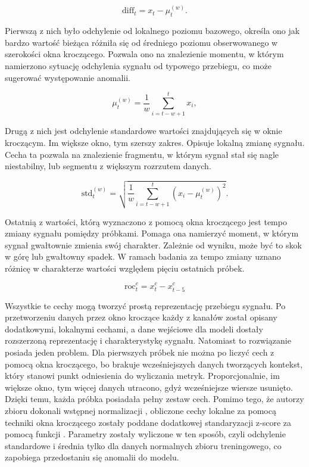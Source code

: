 \documentclass[a4paper,twoside,12pt]{book}
\begin{document}
	\begin{equation}
		\text{diff}_t = x_t - \mu_t^{(w)}.
	\end{equation}
	
	Pierwszą z nich było odchylenie od lokalnego poziomu bazowego, określa ono jak bardzo wartość bieżąca różniła się od średniego poziomu obserwowanego w szerokości okna kroczącego. Pozwala ono na znalezienie momentu, w którym namierzono sytuację odchylenia sygnału od typowego przebiegu, co może sugerować występowanie anomalii. 
	
	\begin{equation}
		\mu_t^{(w)} = \frac{1}{w} \sum_{i=t-w+1}^{t} x_i,
	\end{equation}
	
	Drugą z nich jest odchylenie standardowe wartości znajdujących się w oknie kroczącym. Im większe okno, tym szerszy zakres. Opisuje lokalną zmianę sygnału. Cecha ta pozwala na znalezienie fragmentu, w którym sygnał stał się nagle niestabilny, lub segmentu z większym rozrzutem danych.
	
	\begin{equation}
		\text{std}_t^{(w)} =
		\sqrt{
			\frac{1}{w}
			\sum_{i=t-w+1}^{t}
			\left(x_i - \mu_t^{(w)}\right)^2
		}.
	\end{equation}
	
	Ostatnią z wartości, którą wyznaczono z pomocą okna kroczącego jest tempo zmiany sygnału pomiędzy próbkami. Pomaga ona namierzyć moment, w którym sygnał gwałtownie zmienia swój charakter. Zależnie od wyniku, może być to skok w górę lub gwałtowny spadek. W ramach badania za tempo zmiany uznano różnicę w charakterze wartości względem pięciu ostatnich próbek.
	
	\begin{equation}
		\text{roc}_t^c = x_t^c - x_{t-5}^c
	\end{equation}
	
	
	
	Wszystkie te cechy mogą tworzyć prostą reprezentację przebiegu sygnału. Po przetworzeniu danych przez okno kroczące każdy z kanałów został opisany dodatkowymi, lokalnymi cechami, a dane wejściowe dla modeli dostały rozszerzoną reprezentację i charakterystykę sygnału. Natomiast to rozwiązanie posiada jeden problem. Dla pierwszych próbek nie można po liczyć cech z pomocą okna kroczącego, bo brakuje wcześniejszych danych tworzących kontekst, który stanowi punkt odniesienia do wyliczania metryk. Proporcjonalnie, im większe okno, tym więcej danych utracono, gdyż wcześniejsze wiersze usunięto. Dzięki temu, każda próbka posiadała pełny zestaw cech. Pomimo tego, że autorzy zbioru dokonali wstępnej normalizacji \cite{kotowski2024esaadb}, obliczone cechy lokalne za pomocą techniki okna kroczącego zostały poddane dodatkowej standaryzacji z-score za pomocą funkcji . Parametry zostały wyliczone w ten sposób, czyli odchylenie standardowe i średnia tylko dla danych normalnych zbioru treningowego, co zapobiega przedostaniu się anomalii do modelu.
	
\end{document}
